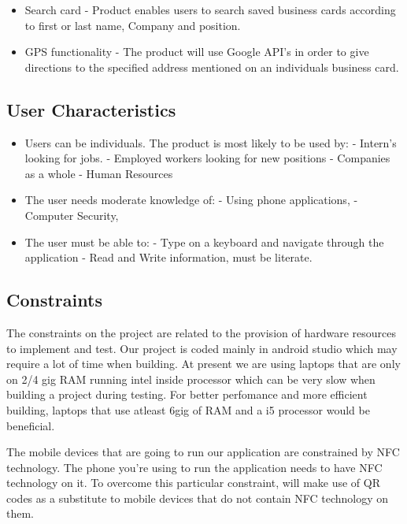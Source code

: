 \documentclass[english]{article}
\begin{document}
\begin{itemize}
					\item
					Search card
					\subitem
					- Product enables users to search saved business cards according to first or last name, Company and position.
					\item
					GPS functionality	
					\subitem
					- The product will use Google API's in order to give directions to the specified address mentioned on an individuals business card.
				\end{itemize}

				\subsection{User Characteristics}
				\begin{itemize}
					\item
					Users can be individuals. The product is most likely to be used by:
					\subitem
					- Intern's looking for jobs.
					\subitem
					- Employed workers looking for new positions
					\subitem
					- Companies as a whole
					\subitem
					- Human Resources
					\item 
					The user needs moderate knowledge of:
					\subitem 
					- Using phone applications, 
					\subitem 
					- Computer Security,  
					\item 
					The user must be able to: 
					\subitem
					- Type on a keyboard and navigate through the application
					\subitem
					- Read and Write information, must be literate.
				\end{itemize}
				
			
				\subsection{Constraints}
            
				
				The constraints on the project are related to the provision of hardware resources to implement and test. 				 Our project is coded
				mainly in android studio which may require a lot of time when building. At present we are using laptops                                 that are only on 2/4 gig RAM
                                running intel inside processor which can be very slow when building a project during testing. For better                                 perfomance and more efficient
                                building, laptops that use atleast 6gig of RAM and a i5 processor would be beneficial.\par

                                The mobile devices that are going to run our application are constrained by NFC technology. The phone                                   you're using to run the application needs to have NFC technology on it. To overcome this particular                                     constraint, will make use of QR codes as a substitute to mobile devices that do not contain NFC                                         technology on them. 
\end{document}

